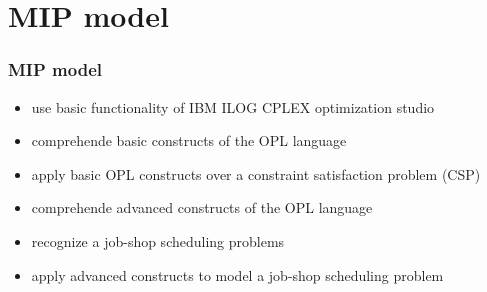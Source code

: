 \section{MIP model}

\begin{frame} \frametitle{MIP model} 

\begin{itemize}[<+->]
\item use basic functionality of IBM ILOG CPLEX optimization studio
\item comprehende basic constructs of the OPL language
\item apply basic OPL constructs over a constraint satisfaction problem (CSP)
\item comprehende advanced constructs of the OPL language
\item recognize a job-shop scheduling problems
\item apply advanced constructs to model a job-shop scheduling problem
\end{itemize}

\end{frame}